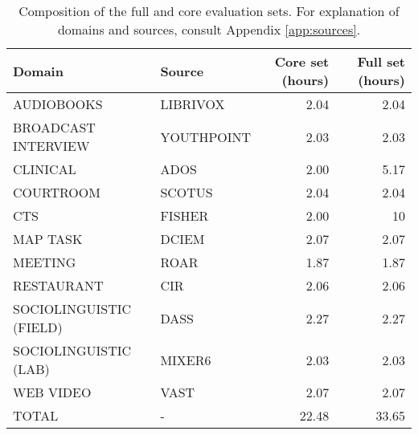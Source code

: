 \documentclass{article}
\begin{document}
\begin{table}[H]
    \centering
        \begin{tabular}{llrr}
        \hline
         {\bf Domain}         & {\bf Source} &  {\bf Core set (hours)} &   {\bf Full set (hours)} \\
        \hline
         AUDIOBOOKS           & LIBRIVOX   &  2.04 &  2.04 \\
         BROADCAST INTERVIEW  & YOUTHPOINT &  2.03 &  2.03\\
         CLINICAL             & ADOS       &  2.00 &  5.17 \\
         COURTROOM            & SCOTUS     &  2.04 &  2.04 \\
         CTS                 & FISHER     &   2.00   &  10 \\
         MAP TASK             & DCIEM      &  2.07 &  2.07 \\
         MEETING              & ROAR       &  1.87 &  1.87 \\
        RESTAURANT            & CIR        &  2.06  &  2.06 \\
         SOCIOLINGUISTIC (FIELD)         & DASS       &  2.27 &  2.27 \\
         SOCIOLINGUISTIC (LAB)           & MIXER6     &  2.03 &  2.03\\
         WEB VIDEO            & VAST       &  2.07 &  2.07 \\
         \hline
         TOTAL                & -          & 22.48 &      33.65 \\
        \hline
        \end{tabular}
    \caption{Composition of the full and core evaluation sets. For explanation of domains and sources, consult Appendix \ref{app:sources}.}
    \label{tab:single_chan_eval_set}
\end{table}
\end{document}
